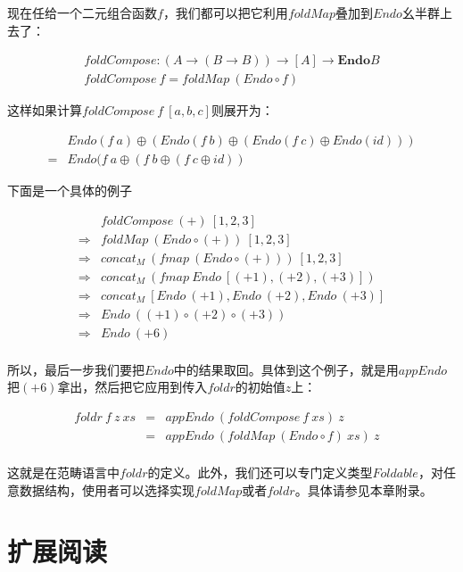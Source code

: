 \documentclass[b5paper]{ctexart}
\begin{document}
现在任给一个二元组合函数$f$，我们都可以把它利用$foldMap$叠加到$Endo$幺半群上去了：

\[
\begin{array}{l}
foldCompose : (A \to (B \to B)) \to [A] \to \mathbf{Endo}B \\
foldCompose\ f = foldMap\ (Endo \circ f)
\end{array}
\]

这样如果计算$foldCompose\ f\ [a, b, c]$则展开为：

\[
\begin{array}{cl}
  & Endo(f\ a) \oplus (Endo(f\ b) \oplus (Endo(f\ c) \oplus Endo(id))) \\
= & Endo(f\ a \oplus (f\ b \oplus (f\ c \oplus id))
\end{array}
\]

下面是一个具体的例子

\[
\begin{array}{cl}
            & foldCompose\ (+)\ [1, 2, 3] \\
\Rightarrow & foldMap\ (Endo \circ (+))\ [1, 2, 3] \\
\Rightarrow & concat_M\ (fmap\ (Endo \circ (+)))\ [1, 2, 3] \\
\Rightarrow & concat_M\ (fmap\ Endo\ [(+1), (+2), (+3)]) \\
\Rightarrow & concat_M\ [Endo\ (+1), Endo\ (+2), Endo\ (+3)] \\
\Rightarrow & Endo\ ((+1) \circ (+2) \circ (+3)) \\
\Rightarrow & Endo\ (+6) \\
\end{array}
\]

所以，最后一步我们要把$Endo$中的结果取回。具体到这个例子，就是用$appEndo$把$(+6)$拿出，然后把它应用到传入$foldr$的初始值$z$上：

\[
\begin{array}{rcll}
foldr\ f\ z\ xs
  & = & appEndo\ (foldCompose\ f\ xs)\ z & \\
  & = & appEndo\ (foldMap\ (Endo \circ f)\ xs)\ z \\
\end{array}
\]

这就是在范畴语言中$foldr$的定义。此外，我们还可以专门定义类型$Foldable$，对任意数据结构，使用者可以选择实现$foldMap$或者$foldr$。具体请参见本章附录。

\section{扩展阅读}
\end{document}

